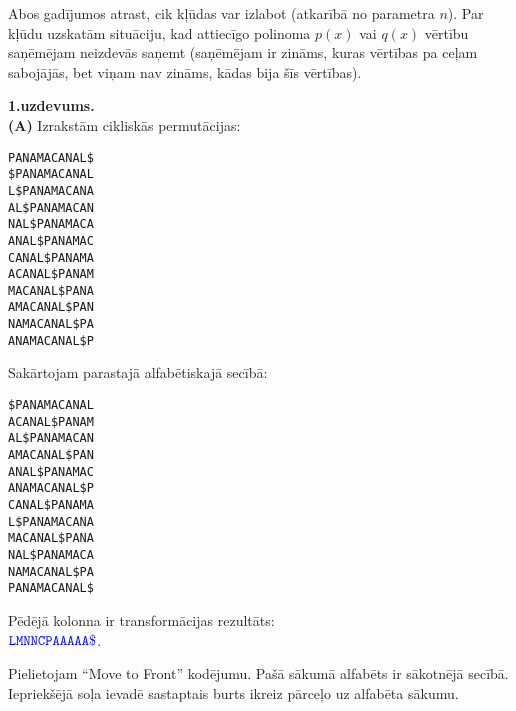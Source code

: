 \documentclass[a4paper]{article}
\begin{document}
\vspace{5pt}
Abos gadījumos atrast, cik kļūdas var izlabot (at\-ka\-rī\-bā no parametra $n$). Par kļūdu uzskatām situāciju, kad 
attiecīgo polinoma $p(x)$ vai $q(x)$ vērtību saņēmējam neizdevās saņemt (saņēmējam ir zināms, kuras vērtības pa ceļam 
sabojājās, bet viņam nav zināms, kādas bija šīs vērtības). 




\newpage
\vspace{10pt}
{\bf 1.uzdevums.}\\ 
{\bf (A)} Izrakstām cikliskās permutācijas:

\begin{verbatim}
PANAMACANAL$
$PANAMACANAL
L$PANAMACANA
AL$PANAMACAN
NAL$PANAMACA
ANAL$PANAMAC
CANAL$PANAMA
ACANAL$PANAM
MACANAL$PANA
AMACANAL$PAN
NAMACANAL$PA
ANAMACANAL$P
\end{verbatim}

Sakārtojam parastajā alfabētiskajā secībā:

\begin{verbatim}
$PANAMACANAL
ACANAL$PANAM
AL$PANAMACAN
AMACANAL$PAN
ANAL$PANAMAC
ANAMACANAL$P
CANAL$PANAMA
L$PANAMACANA
MACANAL$PANA
NAL$PANAMACA
NAMACANAL$PA
PANAMACANAL$
\end{verbatim}

Pēdējā kolonna ir transformācijas rezultāts:\\ 
$\textcolor{blue}{\mathtt{LMNNCPAAAAA\$}}$.

Pielietojam ``Move to Front'' kodējumu. 
Pašā sākumā alfabēts ir sākotnējā secībā. Iepriekšējā soļa ievadē 
sastaptais burts ikreiz pārceļo uz alfabēta sākumu.
\end{document}
